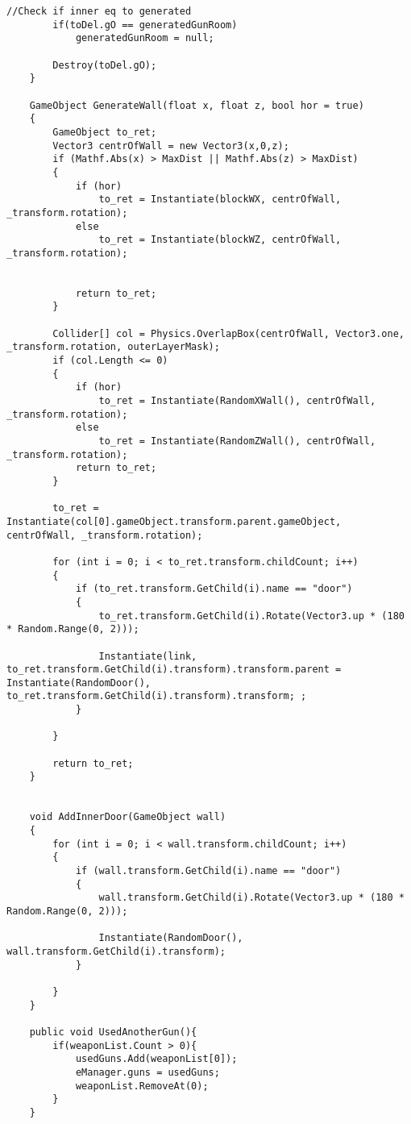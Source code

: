 \documentclass[14pt, titlepage,fleqn,a4paper]{extarticle}
\begin{document}
\begin{lstlisting}[caption= Генератор карты, label=lst:test]
        //Check if inner eq to generated 
        if(toDel.gO == generatedGunRoom)
            generatedGunRoom = null;

        Destroy(toDel.gO);
    }

    GameObject GenerateWall(float x, float z, bool hor = true)
    {
        GameObject to_ret;
        Vector3 centrOfWall = new Vector3(x,0,z);
        if (Mathf.Abs(x) > MaxDist || Mathf.Abs(z) > MaxDist)
        {
            if (hor)
                to_ret = Instantiate(blockWX, centrOfWall, _transform.rotation);
            else
                to_ret = Instantiate(blockWZ, centrOfWall, _transform.rotation);
            
            
            return to_ret;
        }

        Collider[] col = Physics.OverlapBox(centrOfWall, Vector3.one, _transform.rotation, outerLayerMask);
        if (col.Length <= 0)
        {
            if (hor)
                to_ret = Instantiate(RandomXWall(), centrOfWall, _transform.rotation);
            else
                to_ret = Instantiate(RandomZWall(), centrOfWall, _transform.rotation);
            return to_ret;
        }

        to_ret = Instantiate(col[0].gameObject.transform.parent.gameObject, centrOfWall, _transform.rotation);

        for (int i = 0; i < to_ret.transform.childCount; i++)
        {
            if (to_ret.transform.GetChild(i).name == "door")
            {
                to_ret.transform.GetChild(i).Rotate(Vector3.up * (180 * Random.Range(0, 2)));

                Instantiate(link, to_ret.transform.GetChild(i).transform).transform.parent = Instantiate(RandomDoor(), to_ret.transform.GetChild(i).transform).transform; ;
            }

        }

        return to_ret;
    }


    void AddInnerDoor(GameObject wall)
    {
        for (int i = 0; i < wall.transform.childCount; i++)
        {
            if (wall.transform.GetChild(i).name == "door")
            {
                wall.transform.GetChild(i).Rotate(Vector3.up * (180 * Random.Range(0, 2)));
                
                Instantiate(RandomDoor(), wall.transform.GetChild(i).transform);
            }

        }
    }

    public void UsedAnotherGun(){
        if(weaponList.Count > 0){
            usedGuns.Add(weaponList[0]);
            eManager.guns = usedGuns;
            weaponList.RemoveAt(0);
        }
    }
    \end{lstlisting}
    \newpage
    
\end{document}
